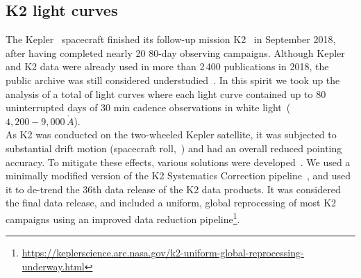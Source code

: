 \documentclass{aa}
\begin{document}
\subsection{K2 light curves}
The Kepler~\citep{koch_kepler_2010} spacecraft finished its follow-up mission K2~\citep{howell_k2_2014} in September 2018, after having completed nearly 20 80-day observing campaigns. Although Kepler and K2 data were already used in more than 2\,400 publications in 2018, the public archive was still considered understudied~\citep{barentsen_retirement_opportunities_2018}. In this spirit we took up the analysis of a total of light curves where each light curve contained up to $80$ uninterrupted days of $30$ min cadence observations in white light~($4,200-9,000\,\mathring{A}$).
\\
As K2 was conducted on the two-wheeled Kepler satellite, it was subjected to substantial drift motion (spacecraft roll,~\citealt{van_cleve_thats_2016}) and had an overall reduced pointing accuracy. To mitigate these effects, various solutions were developed~\citep{vanderburg_k2sff_2014, aigrain_k2sc_2016, luger_everest_2016, luger_everst_2018}. We used a minimally modified version of the K2 Systematics Correction pipeline~\citep{aigrain_k2sc_2016}, and used it to de-trend the 36th data release of the K2 data products. It was considered the final data release, and included a uniform, global reprocessing of most K2 campaigns using an improved data reduction pipeline\footnote{\url{https://keplerscience.arc.nasa.gov/k2-uniform-global-reprocessing-underway.html}}.
\end{document}
